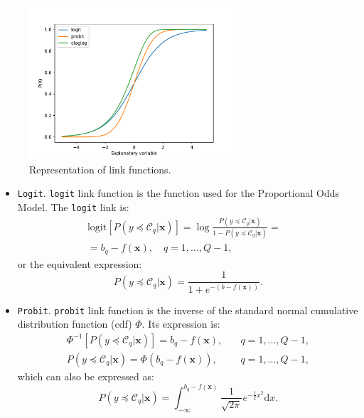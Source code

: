 \documentclass[journal]{IEEEtran}
\begin{document}
	\begin{figure}[!t]
		\centering
		\includegraphics[width=3in]{img/linkfunctions.pdf}
		\caption{Representation of link functions.}
		\label{fig:linkfunctions}
	\end{figure}

	\begin{itemize}
		\item \texttt{Logit}. \texttt{logit} link function is the function used for the Proportional Odds Model. The \texttt{logit} link is:
		\begin{equation}
		\begin{aligned}
		\text{logit}[P(y \preceq \mathcal{C}_q | \mathbf{x})] = \log\frac{P(y \preceq \mathcal{C}_q | \mathbf{x})}{1 - P(y \preceq \mathcal{C}_q | \mathbf{x})}=& \\ = b_q - f(\mathbf{x}), \quad q = 1, ..., Q-1,
		\end{aligned}
		\label{eq:logit}
		\end{equation}		
		or the equivalent expression:		
		\begin{equation}
		P(y \preceq \mathcal{C}_q | \mathbf{x}) = \frac{1}{1 + e^{-(b - f(\mathbf{x}))}}.
		\label{eq:logit2}
		\end{equation}
		
		\item \texttt{Probit}. \texttt{probit} link function is the inverse of the standard normal cumulative distribution function (cdf) $\Phi$. Its expression is:
		\begin{equation}
		\begin{aligned}
		\Phi^{-1}[P(y \preceq \mathcal{C}_q | \mathbf{x})] = b_q - f(\mathbf{x}), \quad &q = 1, ..., Q-1,\\
		P(y \preceq \mathcal{C}_q | \mathbf{x}) = \Phi(b_q - f(\mathbf{x})), \quad &q = 1, ..., Q-1,
		\end{aligned}
		\label{eq:probit}
		\end{equation}		
		which can also be expressed as:
		\begin{equation}
		P(y \preceq \mathcal{C}_q | \mathbf{x}) = \int_{-\infty}^{b_q - f(\mathbf{x})} \frac{1}{\sqrt{2\pi}} e^{-\frac{1}{2}x^2} \mathrm{d}x.
		\label{eq:probit2}
		\end{equation}
		

\end{itemize}
\end{document}
